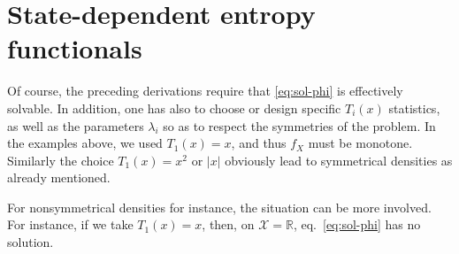 \documentclass[english]{elsarticle}
\theoremstyle{definition}
\theoremstyle{plain}
\theoremstyle{plain}
\def\Rset{\mathbb{R}}
\def\X{\mathcal{X}}
\begin{document}



\section{State-dependent entropy functionals}

\label{sec:MultiformEnt}

Of  course,  the  preceding   derivations  require  that  \eqref{eq:sol-phi}  is
effectively solvable.   In addition, one has  also to choose  or design specific
$T_i(x)$ statistics, as well as the  parameters $\lambda_i$ so as to respect the
symmetries of the problem. In the examples above, we used $T_1(x) = x$, and thus
$f_X$ must be monotone.  Similarly the  choice $T_1(x) = x^2$ or $|x|$ obviously
lead to symmetrical densities as already mentioned.

For nonsymmetrical densities  for instance, the situation can  be more involved.
For   instance,  if   we  take   $T_1(x)   =  x$,   then,  on   $\X  =   \Rset$,
eq.~\eqref{eq:sol-phi} has no solution.

\
\end{document}
